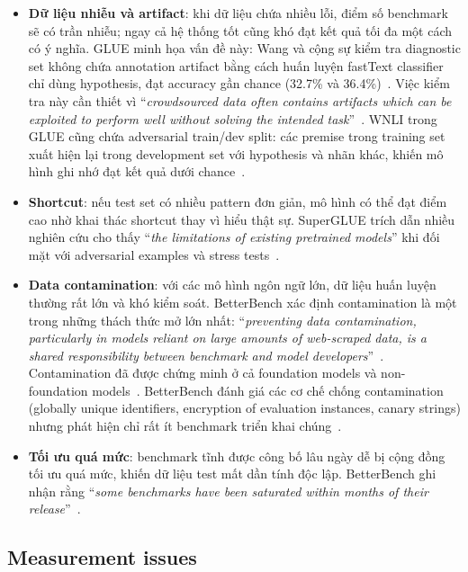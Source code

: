 \begin{itemize}
    \item \textbf{Dữ liệu nhiễu và artifact}: khi dữ liệu chứa nhiều lỗi, điểm số benchmark sẽ có trần nhiễu; ngay cả hệ thống tốt cũng khó đạt kết quả tối đa một cách có ý nghĩa. GLUE minh họa vấn đề này: Wang và cộng sự kiểm tra diagnostic set không chứa annotation artifact bằng cách huấn luyện fastText classifier chỉ dùng hypothesis, đạt accuracy gần chance (32.7\% và 36.4\%)~\cite{glue}. Việc kiểm tra này cần thiết vì ``\textit{crowdsourced data often contains artifacts which can be exploited to perform well without solving the intended task}''~\cite{glue}. WNLI trong GLUE cũng chứa adversarial train/dev split: các premise trong training set xuất hiện lại trong development set với hypothesis và nhãn khác, khiến mô hình ghi nhớ đạt kết quả dưới chance~\cite{superglue}.

    \item \textbf{Shortcut}: nếu test set có nhiều pattern đơn giản, mô hình có thể đạt điểm cao nhờ khai thác shortcut thay vì hiểu thật sự. SuperGLUE trích dẫn nhiều nghiên cứu cho thấy ``\textit{the limitations of existing pretrained models}'' khi đối mặt với adversarial examples và stress tests~\cite{superglue}.

    \item \textbf{Data contamination}: với các mô hình ngôn ngữ lớn, dữ liệu huấn luyện thường rất lớn và khó kiểm soát. BetterBench xác định contamination là một trong những thách thức mở lớn nhất: ``\textit{preventing data contamination, particularly in models reliant on large amounts of web-scraped data, is a shared responsibility between benchmark and model developers}''~\cite{betterbench}. Contamination đã được chứng minh ở cả foundation models và non-foundation models~\cite{betterbench}. BetterBench đánh giá các cơ chế chống contamination (globally unique identifiers, encryption of evaluation instances, canary strings) nhưng phát hiện chỉ rất ít benchmark triển khai chúng~\cite{betterbench}.

    \item \textbf{Tối ưu quá mức}: benchmark tĩnh được công bố lâu ngày dễ bị cộng đồng tối ưu quá mức, khiến dữ liệu test mất dần tính độc lập. BetterBench ghi nhận rằng ``\textit{some benchmarks have been saturated within months of their release}''~\cite{betterbench}.
\end{itemize}

\subsection{Measurement issues}

